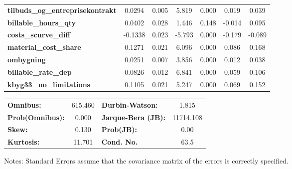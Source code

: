 \begin{center}
\begin{tabular}{lcccccc}
\textbf{tilbuds\_og\_entreprisekontrakt} &       0.0294  &        0.005     &     5.819  &         0.000        &        0.019    &        0.039     \\
\textbf{billable\_hours\_qty}            &       0.0402  &        0.028     &     1.446  &         0.148        &       -0.014    &        0.095     \\
\textbf{costs\_scurve\_diff}             &      -0.1338  &        0.023     &    -5.793  &         0.000        &       -0.179    &       -0.089     \\
\textbf{material\_cost\_share}           &       0.1271  &        0.021     &     6.096  &         0.000        &        0.086    &        0.168     \\
\textbf{ombygning}                       &       0.0251  &        0.007     &     3.856  &         0.000        &        0.012    &        0.038     \\
\textbf{billable\_rate\_dep}             &       0.0826  &        0.012     &     6.841  &         0.000        &        0.059    &        0.106     \\
\textbf{kbyg33\_no\_limitations}         &       0.1105  &        0.021     &     5.247  &         0.000        &        0.069    &        0.152     \\
\bottomrule
\end{tabular}
\begin{tabular}{lclc}
\textbf{Omnibus:}       & 615.460 & \textbf{  Durbin-Watson:     } &     1.815  \\
\textbf{Prob(Omnibus):} &   0.000 & \textbf{  Jarque-Bera (JB):  } & 11714.108  \\
\textbf{Skew:}          &   0.130 & \textbf{  Prob(JB):          } &      0.00  \\
\textbf{Kurtosis:}      &  11.701 & \textbf{  Cond. No.          } &      63.5  \\
\bottomrule
\end{tabular}
\end{center}

Notes: \newline
 [1] Standard Errors assume that the covariance matrix of the errors is correctly specified.